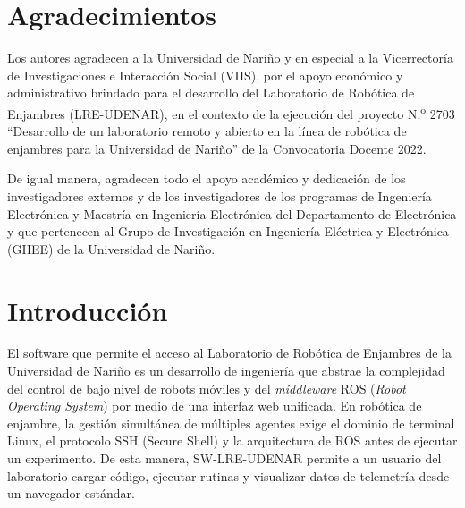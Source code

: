 \documentclass[12pt]{article}
\numberwithin{figure}{section}
\numberwithin{table}{section}
\begin{document}
\thispagestyle{indexpage}
\vspace*{1cm}
\listoftables
\newpage

\thispagestyle{fancy}
\mbox{}
\newpage

\newcommand{\sectionbreak}{\clearpage}


\section{Agradecimientos}
\justifying

Los autores agradecen a la Universidad de Nariño y en especial a la Vicerrectoría de Investigaciones e Interacción Social (VIIS), por el apoyo económico y administrativo brindado para el desarrollo del Laboratorio de Robótica de Enjambres (LRE-UDENAR), en el contexto de la ejecución del proyecto N.\textsuperscript{o} 2703 ``Desarrollo de un laboratorio remoto y abierto en la línea de robótica de enjambres para la Universidad de Nariño'' de la Convocatoria Docente 2022.

De igual manera, agradecen todo el apoyo académico y dedicación de los investigadores externos y de los investigadores de los programas de Ingeniería Electrónica y Maestría en Ingeniería Electrónica del Departamento de Electrónica y que pertenecen al Grupo de Investigación en Ingeniería Eléctrica y Electrónica (GIIEE) de la Universidad de Nariño.


\section{Introducción}
\justifying

El software que permite el acceso al Laboratorio de Robótica de Enjambres de la Universidad de Nariño es un desarrollo de ingeniería que abstrae la complejidad del control de bajo nivel de robots móviles y del \textit{middleware} ROS (\textit{Robot Operating System}) por medio de una interfaz web unificada. En robótica de enjambre, la gestión simultánea de múltiples agentes exige el dominio de terminal Linux, el protocolo SSH (Secure Shell) y la arquitectura de ROS antes de ejecutar un experimento. De esta manera, SW-LRE-UDENAR permite a un usuario del laboratorio cargar código, ejecutar rutinas y visualizar datos de telemetría desde un navegador estándar.
\end{document}
